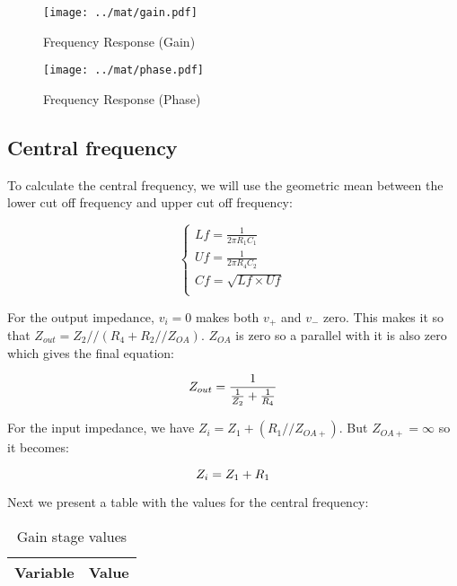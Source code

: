 \begin{figure}[H] \centering
\texttt{[image: ../mat/gain.pdf]}
\caption{Frequency Response (Gain)}
\label{fig:freq}
\end{figure}

\par

\begin{figure}[H] \centering
\texttt{[image: ../mat/phase.pdf]}
\caption{Frequency Response (Phase)}
\label{fig:freq}
\end{figure}


\subsection{Central frequency}
To calculate the central frequency, we will use the geometric mean between the lower cut off frequency and upper cut off frequency:

\begin{equation}\label{eq:OP-AMP}
\begin{cases}
Lf=\frac{1}{2 \pi R_1 C_1}\\
Uf=\frac{1}{2 \pi R_4 C_2}\\
Cf=\sqrt{Lf \times Uf}\\
\end{cases}
\end{equation}

For the output impedance, $v_i=0$ makes both $v_+$ and $v_-$ zero. This makes it so that $Z_{out}=Z_2//(R_4 + R_2//Z_{OA})$. $Z_{OA}$ is zero so a parallel with it is also zero which gives the final equation:

\begin{equation}\label{eq:z_o}
Z_{out}=\frac{1}{\frac{1}{Z_2} + \frac{1}{R_4}}\\
\end{equation}

For the input impedance, we have $Z_i= Z_1+(R_1//Z_{OA+})$. But $Z_{OA+}=\infty$ so it becomes:

\begin{equation}\label{eq:z_o}
Z_i=Z_1 + R_1\\
\end{equation}

Next we present a table with the values for the central frequency:


\begin{table}[H]
  \centering
  \begin{tabular}{|l|r|}
    \hline    
    {\bf Variable} & {\bf Value} \\ \hline
    
  \end{tabular}
  \caption{Gain stage values}
  \label{tab:sim1}
\end{table}



